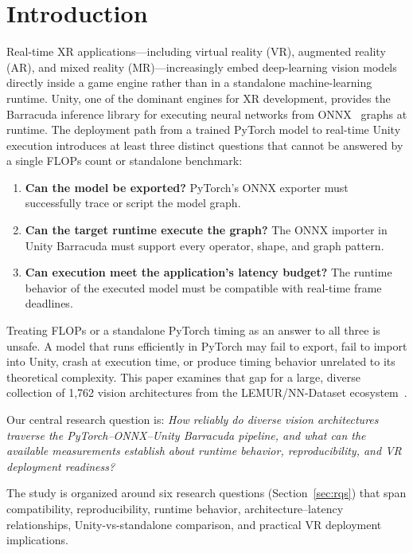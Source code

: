 \documentclass[10pt,twocolumn,letterpaper]{article}
\begin{document}
\section{Introduction}\label{sec:introduction}

Real-time XR applications---including virtual reality (VR), augmented reality (AR), and mixed reality (MR)---increasingly embed deep-learning vision models directly inside a game engine rather than in a standalone machine-learning runtime. Unity, one of the dominant engines for XR development, provides the Barracuda inference library for executing neural networks from ONNX~\cite{onnx2019} graphs at runtime. The deployment path from a trained PyTorch model to real-time Unity execution introduces at least three distinct questions that cannot be answered by a single FLOPs count or standalone benchmark:

\begin{enumerate}[nosep,leftmargin=*]
  \item \textbf{Can the model be exported?} PyTorch's ONNX exporter must successfully trace or script the model graph.
  \item \textbf{Can the target runtime execute the graph?} The ONNX importer in Unity Barracuda must support every operator, shape, and graph pattern.
  \item \textbf{Can execution meet the application's latency budget?} The runtime behavior of the executed model must be compatible with real-time frame deadlines.
\end{enumerate}

Treating FLOPs or a standalone PyTorch timing as an answer to all three is unsafe. A model that runs efficiently in PyTorch may fail to export, fail to import into Unity, crash at execution time, or produce timing behavior unrelated to its theoretical complexity. This paper examines that gap for a large, diverse collection of 1,762 vision architectures from the LEMUR/NN-Dataset ecosystem~\cite{ABrain.NN-Dataset, ABrain.LEMUR2}.

Our central research question is: \emph{How reliably do diverse vision architectures traverse the PyTorch--ONNX--Unity Barracuda pipeline, and what can the available measurements establish about runtime behavior, reproducibility, and VR deployment readiness?}

The study is organized around six research questions (Section~\ref{sec:rqs}) that span compatibility, reproducibility, runtime behavior, architecture--latency relationships, Unity-vs-standalone comparison, and practical VR deployment implications.
\end{document}
